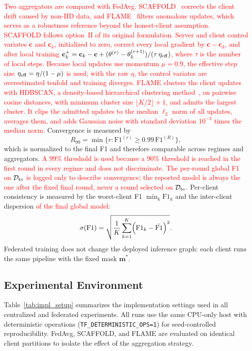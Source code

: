 \documentclass[conference]{IEEEtran}
\begin{document}
\textcolor{red}{Two aggregators are compared with FedAvg.
SCAFFOLD~\cite{karimireddy2020scaffold} corrects the client drift
caused by non-IID data, and FLAME~\cite{nguyen2022flame} filters
anomalous updates, which serves as a robustness reference beyond the
honest-client assumption. SCAFFOLD follows
option~II of its original formulation. Server and client control variates $\mathbf{c}$ and
$\mathbf{c}_k$, initialized to zero, correct every local gradient by
$\mathbf{c}-\mathbf{c}_k$, and after local training
$\mathbf{c}_k^{+}=\mathbf{c}_k-\mathbf{c}+(\theta^{(r)}-
\theta_k^{(r+1)})/(\tau\,\eta_{\rm eff})$, where $\tau$ is the number
of local steps. Because local updates use momentum $\mu=0.9$, the
effective step size $\eta_{\rm eff}=\eta/(1-\mu)$ is used; with the
raw $\eta$, the control variates are overestimated tenfold and
training diverges. FLAME clusters the client
updates with HDBSCAN, a density-based hierarchical clustering
method~\cite{campello2013hdbscan}, on pairwise cosine distances, with minimum cluster size
$\lfloor K/2\rfloor+1$, and admits the largest cluster. It clips the
admitted updates to the median $\ell_2$ norm of all updates, averages
them, and adds Gaussian noise with standard deviation $10^{-3}$ times
the median norm.} Convergence is measured by
\begin{equation}
R_{99}=\min\bigl\{r:\mathrm{F1}^{(r)}\ge
0.99\,\mathrm{F1}^{(R)}\bigr\},
\label{eq:r90}
\end{equation}
which is normalized to the final F1 and therefore comparable across
regimes and aggregators.
\textcolor{red}{A 99\% threshold is used
because a 90\% threshold is reached in the first round in every regime
and does not discriminate.} \textcolor{red}{The per-round global F1 on
$\mathcal{D}_{\rm te}$ is logged only to describe convergence; the
reported model is always the one after the fixed final round, never a
round selected on $\mathcal{D}_{\rm te}$.} Per-client consistency is
measured by the worst-client F1 $\min_k\mathrm{F1}_k$ and the
inter-client dispersion \textcolor{red}{of the final global
model}:
\begin{equation}
\sigma\!\left(\mathrm{F1}\right)=
\sqrt{\frac{1}{K}\sum_{k=1}^{K}
\Bigl(\mathrm{F1}_k-\bar{\mathrm{F1}}\Bigr)^2}.
\label{eq:client_var_round}
\end{equation}
Federated training does not change the deployed inference graph:
each client runs the same pipeline with the fixed mask
$\mathbf{m}^{*}$.

\subsection{Experimental Environment}
\label{subsec:impl_details}
Table~\ref{tab:impl_setup} summarizes the implementation settings
used in all centralized and federated experiments. All runs use the
same CPU-only host with deterministic operations
(\texttt{TF\_DETERMINISTIC\_OPS=1}) for seed-controlled
reproducibility. FedAvg, SCAFFOLD, and FLAME are evaluated on
identical client partitions to isolate the effect of the aggregation
strategy.
\end{document}
